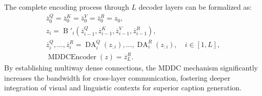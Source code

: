 \documentclass[lettersize,journal]{IEEEtran}
\begin{document}
	The complete encoding process through \(L\) decoder layers can be formalized as:
	\begin{equation} \label{eq:multiway_densformer}
		\begin{gathered}
			\overline{z}_0^Q = \overline{z}_0^K = \overline{z}_0^V = \overline{z}_0^R = z_0, \\
			z_i = \operatorname{B}'_i(\overline{z}_{i-1}^Q, \overline{z}_{i-1}^K, \overline{z}_{i-1}^V, \overline{z}_{i-1}^R), \\
			\overline{z}_i^Q, \dots, \overline{z}_i^R = \operatorname{DA}_i^Q(z_{:i}), \dots, \operatorname{DA}_i^R(z_{:i}), \quad i \in [1, L], \\
			\operatorname{MDDCEncoder}(z) = \overline{z}_L^R.
		\end{gathered}
	\end{equation}
	By establishing multiway dense connections, the MDDC mechanism significantly increases the bandwidth for cross-layer communication, fostering deeper integration of visual and linguistic contexts for superior caption generation.
	
\end{document}
